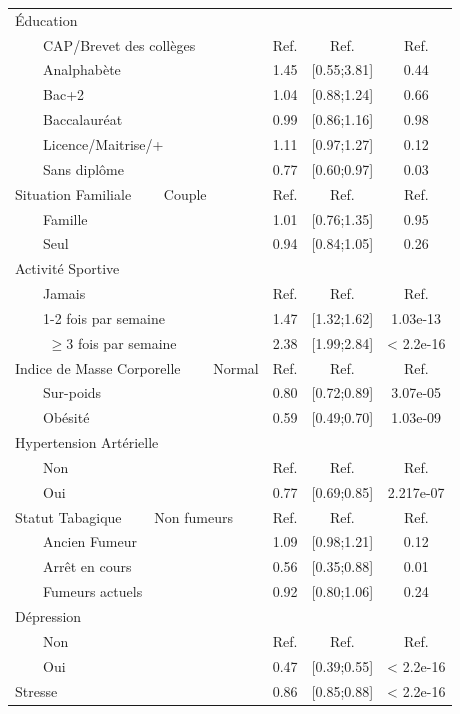 \documentclass{book}
\begin{document}
\begin{longtable}{lccc}
 
Éducation&&&\\
$\qquad$CAP/Brevet des collèges &Ref.&Ref.&Ref.\\
$\qquad$Analphabète &1.45& [0.55;3.81] & 0.44 \\   
$\qquad$Bac+2       &1.04 & [0.88;1.24] & 0.66   \\  
$\qquad$Baccalauréat   &0.99& [0.86;1.16] & 0.98   \\        
$\qquad$Licence/Maitrise/+   &1.11 & [0.97;1.27] & 0.12 \\   
$\qquad$Sans diplôme   &0.77 & [0.60;0.97] & 0.03\\

         
Situation Familiale
$\qquad$Couple&Ref.&Ref.&Ref.\\
$\qquad$Famille&1.01& [0.76;1.35]& 0.95\\    
$\qquad$Seul&0.94 & [0.84;1.05]& 0.26   \\

Activité Sportive&&&\\
$\qquad$Jamais & Ref.&Ref.&Ref.\\
$\qquad$1-2 fois par semaine&1.47& [1.32;1.62]& 1.03e-13\\
$\qquad$ $\geq$3 fois par semaine &2.38 &[1.99;2.84] &< 2.2e-16\\
                  

Indice de Masse Corporelle
$\qquad$Normal &Ref.&Ref.&Ref.\\
$\qquad$Sur-poids &0.80 &[0.72;0.89]& 3.07e-05\\ 
$\qquad$Obésité&0.59& [0.49;0.70]& 1.03e-09\\ 

Hypertension Artérielle&&&\\
$\qquad$Non& Ref.&Ref.&Ref.\\
$\qquad$Oui &0.77 &[0.69;0.85]& 2.217e-07\\ 

Statut Tabagique
$\qquad$Non fumeurs &Ref.&Ref.&Ref.\\
$\qquad$Ancien Fumeur &1.09& [0.98;1.21]& 0.12\\    
$\qquad$Arrêt en cours &0.56 &[0.35;0.88]& 0.01\\ 
$\qquad$Fumeurs actuels &0.92& [0.80;1.06]& 0.24\\

Dépression&&&\\
$\qquad$Non&Ref.&Ref.&Ref.\\
$\qquad$Oui & 0.47 &[0.39;0.55]& < 2.2e-16\\
Stresse &0.86& [0.85;0.88]& < 2.2e-16\\ 
\hline
\end{longtable}
\end{document}
